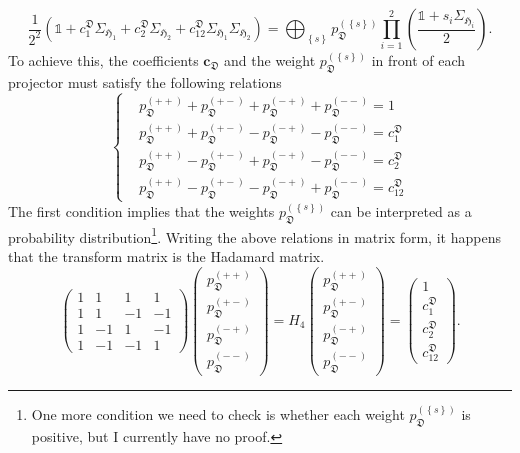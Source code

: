\documentclass[12font]{article}
\theoremstyle{definition}
\newcommand{\lr}[1]{\left(  #1  \right)}
\newcommand{\lrg}[1]{\left\{  #1  \right\}}
\begin{document}
\[
\frac{1}{2^{2}}\lr{\mathds{1} + c^{\mathfrak{D}}_1\Sigma_{\mathfrak{H}_1} + c^{\mathfrak{D}}_2\Sigma_{\mathfrak{H}_2} + c^{\mathfrak{D}}_{12}\Sigma_{\mathfrak{H}_1}\Sigma_{\mathfrak{H}_2}}
=
\bigoplus_{\lrg{s}} p_\mathfrak{D}^{(\lrg{s})} \prod_{i=1}^{2}\lr{\frac{\mathds{1} + s_i\Sigma_{\mathfrak{H}_i}}{2}}.
\]
To achieve this, the coefficients $\mathbf{c}_\mathfrak{D}$ and the weight $p_\mathfrak{D}^{(\lrg{s})}$ in front of each projector must satisfy the following relations
\[
\left\{
\begin{aligned}
    & p_\mathfrak{D}^{(++)} + p_\mathfrak{D}^{(+-)} + p_\mathfrak{D}^{(-+)} + p_\mathfrak{D}^{(--)} = 1 \\
    & p_\mathfrak{D}^{(++)} + p_\mathfrak{D}^{(+-)} - p_\mathfrak{D}^{(-+)} - p_\mathfrak{D}^{(--)} = c^{\mathfrak{D}}_1 \\
    & p_\mathfrak{D}^{(++)} - p_\mathfrak{D}^{(+-)} + p_\mathfrak{D}^{(-+)} - p_\mathfrak{D}^{(--)} = c^{\mathfrak{D}}_2 \\
    & p_\mathfrak{D}^{(++)} - p_\mathfrak{D}^{(+-)} - p_\mathfrak{D}^{(-+)} + p_\mathfrak{D}^{(--)} = c^{\mathfrak{D}}_{12} 
\end{aligned}
\right.
\]
The first condition implies that the weights $p_\mathfrak{D}^{(\lrg{s})}$ can be interpreted as a probability distribution\footnote{One more condition we need to check is whether each weight $p_\mathfrak{D}^{(\lrg{s})}$ is positive, but I currently have no proof.}. Writing the above relations in matrix form, it happens that the transform matrix is the Hadamard matrix.
\[
\begin{pmatrix}
    1 & 1 & 1 & 1 \\
    1 & 1 & -1 & -1 \\
    1 & -1 & 1 & -1 \\
    1 & -1 & -1 & 1
\end{pmatrix}
\begin{pmatrix}
    p_\mathfrak{D}^{(++)} \\
    p_\mathfrak{D}^{(+-)} \\
    p_\mathfrak{D}^{(-+)} \\
    p_\mathfrak{D}^{(--)}
\end{pmatrix}
=
H_4
\begin{pmatrix}
    p_\mathfrak{D}^{(++)} \\
    p_\mathfrak{D}^{(+-)} \\
    p_\mathfrak{D}^{(-+)} \\
    p_\mathfrak{D}^{(--)}
\end{pmatrix}
=
\begin{pmatrix}
    1 \\
    c^{\mathfrak{D}}_1 \\
    c^{\mathfrak{D}}_2 \\
    c^{\mathfrak{D}}_{12}
\end{pmatrix}.
\]
\end{document}
